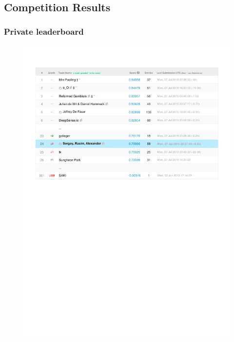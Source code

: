 \subsection{Competition Results}

\begin{frame}\frametitle{Private leaderboard} 
\vspace{-20pt}
\begin{center}
\begin{figure}
\includegraphics[width=\textwidth]{pics/private_lb_selected.pdf}
\end{figure}
\end{center}
\end{frame}


